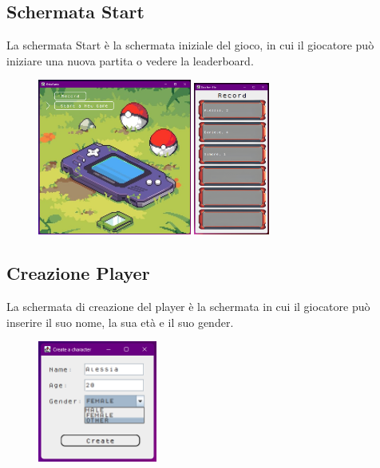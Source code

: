 \documentclass[12pt]{article}
\begin{document}
\subsection{Schermata Start}
La schermata Start è la schermata iniziale del gioco, in cui il giocatore può iniziare una nuova partita o vedere la leaderboard.
\begin{figure}[h]
    \centering
    \includegraphics[width=0.45\textwidth]{Images/start.png}
    \includegraphics[width=0.22\textwidth]{Images/record.png}
\end{figure}
\newpage
\subsection{Creazione Player}
La schermata di creazione del player è la schermata in cui il giocatore può inserire il suo nome, la sua età e il suo gender.
\begin{figure}[h]
    \centering
    \includegraphics[width=0.35\textwidth]{Images/player.png}
\end{figure}
\end{document}
